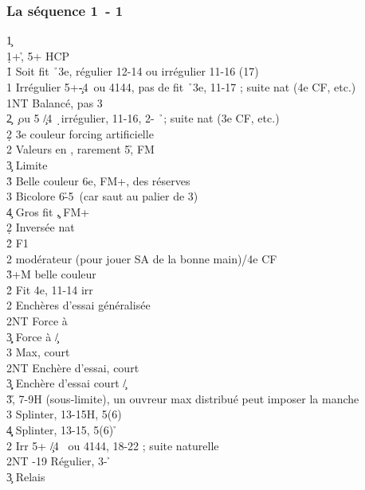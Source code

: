 \documentclass[a4paper]{article}
\begin{document}
\subsubsection{La séquence 1\pdfc\ - 1\pdfd}

\begin{bidtable}
1\c\+\\
1\d {}+\h , 5+ HCP\+\\
1\h \> Soit fit \h\ 3e, régulier 12-14 ou irrégulier 11-16 (17)\\
1\s \> Irrégulier 5+\c -4\s\ ou 4144, pas de fit \h\ 3e, 11-17 ; suite nat (4e CF, etc.)\\
1NT \> Balancé, pas 3\h \\
2\c {} \c\ ou 5 \c /4 \d\ irrégulier, 11-16, 2- \h\ ; suite nat (3e CF, etc.)\+\\
2\d \> 3e couleur forcing artificielle\\
2\s \> Valeurs en \s , rarement 5\h , FM\\
3\c \> Limite\\
3\h \> Belle couleur 6e, FM+, des réserves\\
3\s \> Bicolore 6\h -5\s\ (car saut au palier de 3)\\
4\c \> Gros fit \c , FM+\-\\
2\d \> Inversée nat\+\\
2\h \> F1\\
2\s \> modérateur (pour jouer SA de la bonne main)/4e CF\\
3\h {}+M belle couleur\-\\
2\h \> Fit 4e, 11-14 irr\+\\
2\s \> Enchères d'essai généralisée\+\\
2NT \> Force à \s \\
3\c\d \> Force à \c /\d \\
3\s \> Max, court \s \-\\
2NT \> Enchère d'essai, court \s \\
3\c\d \> Enchère d'essai court \c /\d \\
3\h {}\h , 7-9H (sous-limite), un ouvreur max distribué peut imposer la manche\\
3\s \> Splinter, 13-15H, 5(6) \h \\
4\c\d \> Splinter, 13-15, 5(6) \h \-\\
2\s \> Irr 5+ \c /4 \s\ ou 4144, 18-22 ; suite naturelle\\
2NT -19 Régulier, 3- \h \+\\
3\c \> Relais\+\\

\end{bidtable}
\end{document}
